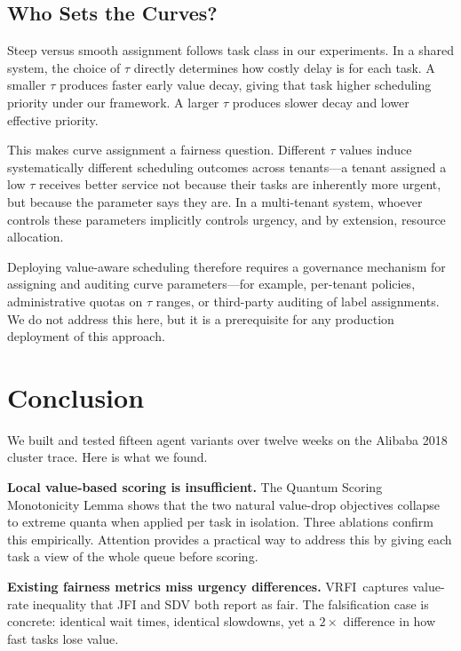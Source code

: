 \documentclass[10pt,twocolumn]{article}
\theoremstyle{remark}
\newcommand{\vrfi}{\textsc{VRFI}}
\begin{document}
\subsection{Who Sets the Curves?}

Steep versus smooth assignment follows task class in our experiments.
In a shared system, the choice of $\tau$ directly determines how
costly delay is for each task. A smaller $\tau$ produces faster
early value decay, giving that task higher scheduling priority under
our framework. A larger $\tau$ produces slower decay and lower
effective priority.

This makes curve assignment a fairness question. Different $\tau$
values induce systematically different scheduling outcomes across
tenants---a tenant assigned a low $\tau$ receives better service not
because their tasks are inherently more urgent, but because the
parameter says they are. In a multi-tenant system, whoever controls
these parameters implicitly controls urgency, and by extension,
resource allocation.

Deploying value-aware scheduling therefore requires a governance
mechanism for assigning and auditing curve parameters---for example,
per-tenant policies, administrative quotas on $\tau$ ranges, or
third-party auditing of label assignments. We do not address this
here, but it is a prerequisite for any production deployment of this
approach.

\section{Conclusion}

We built and tested fifteen agent variants over twelve weeks on the
Alibaba 2018 cluster trace. Here is what we found.

\textbf{Local value-based scoring is insufficient.} The Quantum
Scoring Monotonicity Lemma shows that the two natural value-drop
objectives collapse to extreme quanta when applied per task in
isolation. Three ablations confirm this empirically. Attention
provides a practical way to address this by giving each task a view
of the whole queue before scoring.

\textbf{Existing fairness metrics miss urgency differences.} \vrfi\
captures value-rate inequality that JFI and SDV both report as fair.
The falsification case is concrete: identical wait times, identical
slowdowns, yet a $2\times$ difference in how fast tasks lose value.
\end{document}

